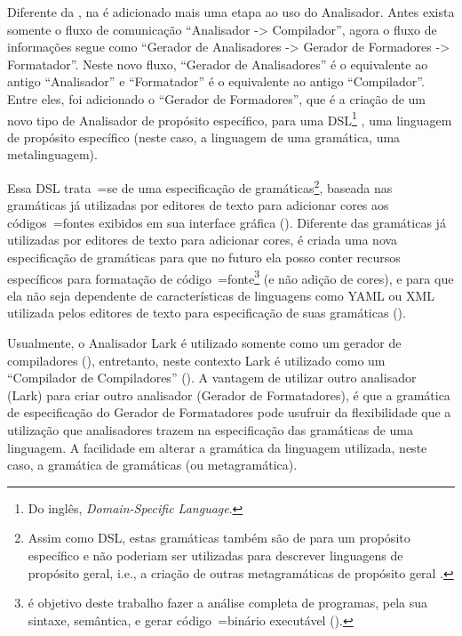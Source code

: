 Diferente da ,
na  é adicionado mais uma etapa ao uso do Analisador.
Antes exista somente o fluxo de comunicação ``Analisador -> Compilador'',
agora o fluxo de informações segue como ``Gerador de Analisadores -> Gerador de Formadores -> Formatador''.
Neste novo fluxo,
``Gerador de Analisadores'' é o equivalente ao antigo ``Analisador'' e
``Formatador'' é o equivalente ao antigo ``Compilador''.
Entre eles,
foi adicionado o ``Gerador de Formadores'',
que é a criação de um novo tipo de Analisador de propósito específico,
para uma DSL\footnote{%
Do inglês,
\textit{Domain-Specific Language}.
} \cite{areThereDomainSpecificLanguages,yamlSpecificModelChecking},
uma linguagem de propósito específico (neste caso,
a linguagem de uma gramática,
uma metalinguagem).

Essa DSL trata~=se de uma especificação de gramáticas\footnote{
Assim como DSL\s,
estas gramáticas também são de para um propósito específico e
não poderiam ser utilizadas para descrever linguagens de propósito geral,
i.e.,
a criação de outras metagramáticas de propósito geral \cite{turingCompleteRegularLanguages}.
},
baseada nas gramáticas já utilizadas por editores de texto para adicionar cores aos códigos~=fontes exibidos em sua interface gráfica ().
Diferente das gramáticas já utilizadas por editores de texto para adicionar cores,
é criada uma nova especificação de gramáticas para que no futuro ela posso conter recursos específicos para formatação de código~=fonte\footnote{
 é objetivo deste trabalho fazer a análise completa de programas,
pela sua sintaxe, semântica,
e gerar código~=binário executável ().
}
(e não adição de cores),
e para que ela não seja dependente de características de linguagens como YAML ou
XML utilizada pelos editores de texto para especificação de suas gramáticas ().

Usualmente,
o Analisador Lark é utilizado somente como um gerador de compiladores (),
entretanto,
neste contexto Lark é utilizado como um ``Compilador de Compiladores'' ().
A vantagem de utilizar outro analisador (Lark) para criar outro analisador (Gerador de Formatadores),
é que a gramática de especificação do Gerador de Formatadores pode usufruir da flexibilidade que a utilização que analisadores trazem na especificação das gramáticas de uma linguagem.
A facilidade em alterar a gramática da linguagem utilizada,
neste caso,
a gramática de gramáticas (ou metagramática).

